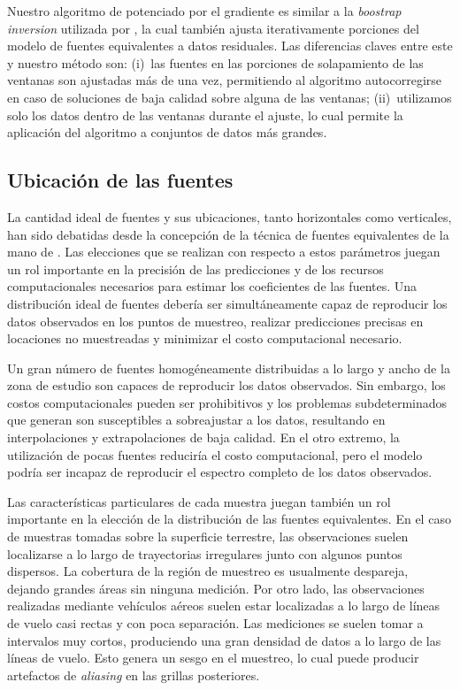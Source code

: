 Nuestro algoritmo de potenciado por el gradiente es similar a la \emph{boostrap
inversion} utilizada por \citet{vonfrese1988}, la cual también ajusta
iterativamente porciones del modelo de fuentes equivalentes a datos residuales.
Las diferencias claves entre este y nuestro método son:
(i)~las fuentes en las porciones de solapamiento de las ventanas son ajustadas
más de una vez, permitiendo al algoritmo autocorregirse en caso de soluciones
de baja calidad sobre alguna de las ventanas;
(ii)~utilizamos solo los datos dentro de las ventanas durante el ajuste, lo
cual permite la aplicación del algoritmo a conjuntos de datos más grandes.


\subsection{Ubicación de las fuentes}
\label{sec:source_distribution}

La cantidad ideal de fuentes y sus ubicaciones, tanto horizontales como
verticales, han sido debatidas desde la concepción de la técnica de fuentes
equivalentes de la mano de \citet{dampney1969}.
Las elecciones que se realizan con respecto a estos parámetros juegan un rol
importante en la precisión de las predicciones y de los recursos
computacionales necesarios para estimar los coeficientes de las fuentes.
Una distribución ideal de fuentes debería ser simultáneamente capaz de
reproducir los datos observados en los puntos de muestreo, realizar
predicciones precisas en locaciones no muestreadas y minimizar el costo
computacional necesario.

Un gran número de fuentes homogéneamente distribuidas a lo largo y ancho de la
zona de estudio son capaces de reproducir los datos observados.
Sin embargo, los costos computacionales pueden ser prohibitivos y los problemas
subdeterminados que generan son susceptibles a sobreajustar a los datos,
resultando en interpolaciones y extrapolaciones de baja calidad.
En el otro extremo, la utilización de pocas fuentes reduciría el costo
computacional, pero el modelo podría ser incapaz de reproducir el espectro
completo de los datos observados.

Las características particulares de cada muestra juegan también un rol
importante en la elección de la distribución de las fuentes equivalentes.
En el caso de muestras tomadas sobre la superficie terrestre, las observaciones
suelen localizarse a lo largo de trayectorias irregulares junto con algunos
puntos dispersos.
La cobertura de la región de muestreo es usualmente despareja, dejando grandes
áreas sin ninguna medición.
Por otro lado, las observaciones realizadas mediante vehículos aéreos suelen
estar localizadas a lo largo de líneas de vuelo casi rectas y con poca
separación.
Las mediciones se suelen tomar a intervalos muy cortos, produciendo una gran
densidad de datos a lo largo de las líneas de vuelo.
Esto genera un sesgo en el muestreo, lo cual puede producir artefactos de
\emph{aliasing} en las grillas posteriores.

